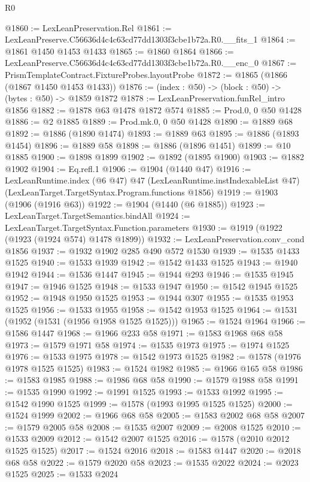 \begin{lexlean}{R0}
\begin{coremodule}
@1860 := LexLeanPreservation.Rel
@1861 := LexLeanPreserve.C56636d4c4c63cd77dd1303f3cbe1b72a.R0.__fits_1
@1864 := @1861 @1450 @1453 @1433
@1865 := @1860 @1864
@1866 := LexLeanPreserve.C56636d4c4c63cd77dd1303f3cbe1b72a.R0.__enc_0
@1867 := PrismTemplateContract.FixtureProbes.layoutProbe
@1872 := @1865 (@1866 (@1867 @1450 @1453 @1433))
@1876 := (index : @50) -> (block : @50) -> (bytes : @50) -> @1859 @1872
@1878 := LexLeanPreservation.funRel_intro @1856
@1882 := @1878 @63 @1478 @1872 @574
@1885 := Prod.{0, 0} @50 @1428
@1886 := @2 @1885
@1889 := Prod.mk.{0, 0} @50 @1428
@1890 := @1889 @68
@1892 := @1886 (@1890 @1474)
@1893 := @1889 @63
@1895 := @1886 (@1893 @1454)
@1896 := @1889 @58
@1898 := @1886 (@1896 @1451)
@1899 := @10 @1885
@1900 := @1898 @1899
@1902 := @1892 (@1895 @1900)
@1903 := @1882 @1902
@1904 := Eq.refl.{1}
@1906 := @1904 (@1440 @47)
@1916 := LexLeanRuntime.index
    (@6 @47)
    @47
    (LexLeanRuntime.instIndexableList @47)
    (LexLeanTarget.TargetSyntax.Program.functions @1856)
@1919 := @1903 (@1906 (@1916 @63))
@1922 := @1904 (@1440 (@6 @1885))
@1923 := LexLeanTarget.TargetSemantics.bindAll
@1924 := LexLeanTarget.TargetSyntax.Function.parameters
@1930 := @1919 (@1922 (@1923 (@1924 @574) @1478 @1899))
@1932 := LexLeanPreservation.conv_cond @1856
@1937 := @1932 @1902 @285 @490 @572 @1530
@1939 := @1535 @1433 @1525
@1940 := @1533 @1939
@1942 := @1542 @1433 @1525
@1943 := @1940 @1942
@1944 := @1536 @1447
@1945 := @1944 @293
@1946 := @1535 @1945
@1947 := @1946 @1525
@1948 := @1533 @1947
@1950 := @1542 @1945 @1525
@1952 := @1948 @1950 @1525
@1953 := @1944 @307
@1955 := @1535 @1953 @1525
@1956 := @1533 @1955
@1958 := @1542 @1953 @1525
@1964 := @1531 (@1952 (@1531 (@1956 @1958 @1525 @1525)))
@1965 := @1524 @1964
@1966 := @1586 @1447
@1968 := @1966 @233 @58
@1971 := @1583 @1968 @68 @58
@1973 := @1579 @1971 @58
@1974 := @1535 @1973
@1975 := @1974 @1525
@1976 := @1533 @1975
@1978 := @1542 @1973 @1525
@1982 := @1578 (@1976 @1978 @1525 @1525)
@1983 := @1524 @1982
@1985 := @1966 @165 @58
@1986 := @1583 @1985
@1988 := @1986 @68 @58
@1990 := @1579 @1988 @58
@1991 := @1535 @1990
@1992 := @1991 @1525
@1993 := @1533 @1992
@1995 := @1542 @1990 @1525
@1999 := @1578 (@1993 @1995 @1525 @1525)
@2000 := @1524 @1999
@2002 := @1966 @68 @58
@2005 := @1583 @2002 @68 @58
@2007 := @1579 @2005 @58
@2008 := @1535 @2007
@2009 := @2008 @1525
@2010 := @1533 @2009
@2012 := @1542 @2007 @1525
@2016 := @1578 (@2010 @2012 @1525 @1525)
@2017 := @1524 @2016
@2018 := @1583 @1447
@2020 := @2018 @68 @58
@2022 := @1579 @2020 @58
@2023 := @1535 @2022
@2024 := @2023 @1525
@2025 := @1533 @2024

\end{coremodule}
\end{lexlean}
